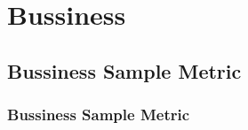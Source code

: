 \chapter{Bussiness}


\clearpage
\thispagestyle{businessstyle}
\section{Bussiness Sample Metric}
\subsection{Bussiness Sample Metric}